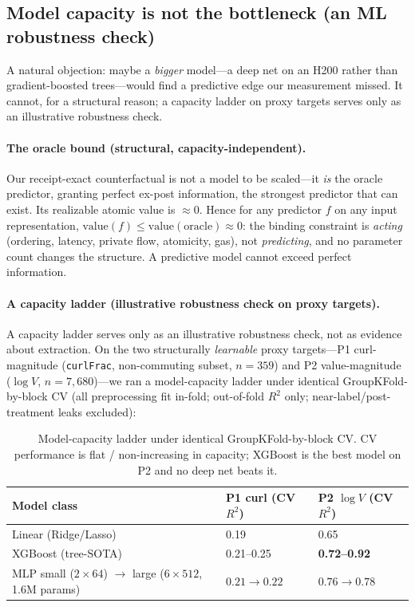 \documentclass[11pt]{article}
\newcommand{\code}[1]{\texttt{#1}}
\begin{document}
\subsection{Model capacity is not the bottleneck (an ML robustness check)}
A natural objection: maybe a \emph{bigger} model---a deep net on an H200 rather than
gradient-boosted trees---would find a predictive edge our measurement missed. It
cannot, for a structural reason; a capacity ladder on proxy targets serves only as an
illustrative robustness check.

\paragraph{The oracle bound (structural, capacity-independent).} Our receipt-exact
counterfactual is not a model to be scaled---it \emph{is} the oracle predictor, granting
perfect ex-post information, the strongest predictor that can exist. Its realizable atomic
value is $\approx 0$. Hence for any predictor $f$ on any input representation,
$\text{value}(f) \le \text{value}(\text{oracle}) \approx 0$: the binding constraint is
\emph{acting} (ordering, latency, private flow, atomicity, gas), not \emph{predicting},
and no parameter count changes the structure. A predictive model cannot exceed perfect
information.

\paragraph{A capacity ladder (illustrative robustness check on proxy targets).} A
capacity ladder serves only as an illustrative robustness check, not as evidence about
extraction. On the two structurally \emph{learnable} proxy
targets---P1 curl-magnitude (\code{curlFrac}, non-commuting subset, $n=359$) and P2
value-magnitude ($\log V$, $n=7{,}680$)---we ran a model-capacity ladder under identical
GroupKFold-by-block CV (all preprocessing fit in-fold; out-of-fold $R^2$ only;
near-label/post-treatment leaks excluded):

\begin{table}[h]\centering
\caption{Model-capacity ladder under identical GroupKFold-by-block CV. CV performance is
flat / non-increasing in capacity; XGBoost is the best model on P2 and no deep net beats
it.}\label{tab:capacity}
\small
\begin{tabular}{lll}
\toprule
Model class & P1 curl (CV $R^2$) & P2 $\log V$ (CV $R^2$) \\
\midrule
Linear (Ridge/Lasso) & 0.19 & 0.65 \\
XGBoost (tree-SOTA) & 0.21--0.25 & \textbf{0.72--0.92} \\
MLP small ($2\times64$) $\to$ large ($6\times512$, 1.6M params) & $0.21 \to 0.22$ & $0.76 \to 0.78$ \\
\bottomrule
\end{tabular}
\end{table}
\end{document}
